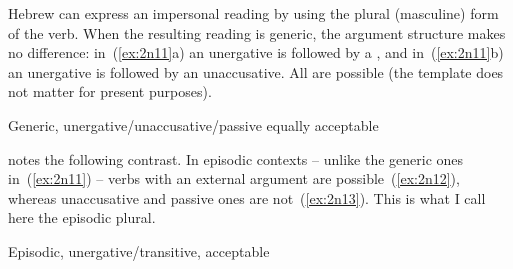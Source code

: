 \begin{exe}
\begin{xlist}
\begin{exe}
\begin{xlist}
\begin{exe}
\begin{xlist}
\begin{exe}
\begin{exe}
\begin{xlist}
\begin{exe}
\begin{xlist}
\begin{exe}
\begin{xlist}
\begin{exe}
\begin{xlist}
\begin{exe}
\begin{xlist}
\begin{exe}
\begin{xlist}
Hebrew can express an impersonal reading by using the plural (masculine) form of the verb. When the resulting reading is generic, the argument structure makes no difference: in~(\ref{ex:2n11}a) an unergative is followed by a , and in~(\ref{ex:2n11}b) an unergative is followed by an unaccusative. All are possible (the template does not matter for present purposes).
 \begin{exe}
 \ex  Generic, unergative/unaccusative/passive equally acceptable \citep[86]{borer98csli}\label{ex:2n11} 
 \begin{xlist} 
	
	
 \z
\z 

\cite{borer98csli} notes the following contrast. In episodic contexts -- unlike the generic ones in~(\ref{ex:2n11}) -- verbs with an external argument are possible~(\ref{ex:2n12}), whereas unaccusative and passive ones are not~(\ref{ex:2n13}). This is what I call here the episodic plural.

 \begin{exe}
 \ex  Episodic, unergative/transitive, acceptable \label{ex:2n12}
 \begin{xlist} 
	
	
	

\end{xlist}
\end{exe}
\end{xlist}
\end{exe}
\end{xlist}
\end{exe}
\end{xlist}
\end{exe}
\end{xlist}
\end{exe}
\end{xlist}
\end{exe}
\end{xlist}
\end{exe}
\end{xlist}
\end{exe}
\end{exe}
\end{xlist}
\end{exe}
\end{xlist}
\end{exe}
\end{xlist}
\end{exe}
